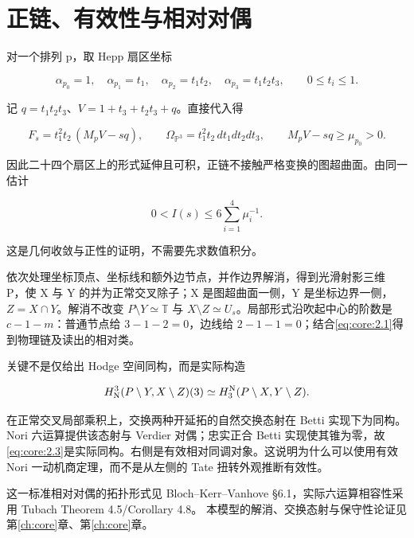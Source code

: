 \documentclass[11pt,a4paper,oneside]{ctexrep}
\theoremstyle{cnplain}
\theoremstyle{definition}
\theoremstyle{remark}
\begin{document}
\section{正链、有效性与相对对偶}\label{sec:core:2}

对一个排列 p，取 Hepp 扇区坐标

\begin{equation}
\alpha_{p_0}=1,\quad\alpha_{p_1}=t_1,\quad
 \alpha_{p_2}=t_1t_2,\quad\alpha_{p_3}=t_1t_2t_3,
 \qquad 0\leq t_i\leq1.
\end{equation}

记 \(q=t_1t_2t_3\)、\(V=1+t_3+t_2t_3+q\)。直接代入得

\begin{equation}
F_s=t_1^2t_2\,(M_pV-sq),\qquad
 \Omega_{\mathbb P^3}=t_1^2t_2\,dt_1dt_2dt_3,
 \qquad M_pV-sq\geq\mu_{p_0}>0.                        \label{eq:core:2.1}
\end{equation}

因此二十四个扇区上的形式延伸且可积，正链不接触严格变换的图超曲面。由同一估计

\begin{equation}
0<I(s)\leq6\sum_{i=1}^4\mu_i^{-1}.       \label{eq:core:2.2}
\end{equation}

这是几何收敛与正性的证明，不需要先求数值积分。

依次处理坐标顶点、坐标线和额外边节点，并作边界解消，得到光滑射影三维 P，使 X 与 Y 的并为正常交叉除子；X 是图超曲面一侧，Y 是坐标边界一侧，\(Z=X\cap Y\)。解消不改变 \(P\setminus Y\simeq\mathbb T\) 与 \(X\setminus Z\simeq U_s\)。局部形式沿吹起中心的阶数是 \(c- 1- m\)：普通节点给 \(3- 1- 2=0\)，边线给 \(2- 1- 1=0\)；结合\eqref{eq:core:2.1}得到物理链及读出的相对类。

关键不是仅给出 Hodge 空间同构，而是实际构造

\begin{equation}
H^3_{\rm N}(P\setminus Y,X\setminus Z)(3)
       \simeq H^{\rm N}_3(P\setminus X,Y\setminus Z).   \label{eq:core:2.3}
\end{equation}

在正常交叉局部乘积上，交换两种开延拓的自然交换态射在 Betti 实现下为同构。Nori 六运算提供该态射与 Verdier 对偶；忠实正合 Betti 实现使其锥为零，故\eqref{eq:core:2.3}是实际同构。右侧是有效相对同调对象。这说明为什么可以使用有效 Nori 一动机商定理，而不是从左侧的 Tate 扭转外观推断有效性。

这一标准相对对偶的拓扑形式见 Bloch--Kerr--Vanhove §6.1，实际六运算相容性采用 Tubach Theorem 4.5/Corollary 4.8。\cite{bkv,tubach} 本模型的解消、交换态射与保守性论证见 第\ref{ch:core}章、第\ref{ch:core}章。
\end{document}
